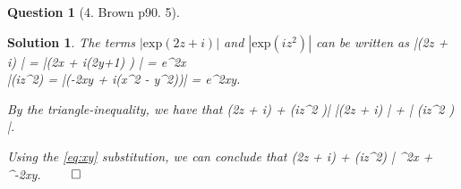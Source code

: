 \documentclass{article} %
\def\eQb#1\eQe{\begin{eqnarray*}#1\end{eqnarray*}}
\def\eQnb#1\eQne{\begin{eqnarray}#1\end{eqnarray}}
\theoremstyle{quest}
\newtheorem*{question}{Question}
\newtheorem*{solution}{Solution}
\begin{document}
\pagebreak

\begin{question}[4. Brown p90. 5]
\end{question}
\begin{solution}
The terms $| \mathrm{exp}(2z + i) |$ and $| \mathrm{exp}(iz^2 )|$ can be written as
\eQnb \label{eq:xy}
|(2z + i) | = |(2x + i(2y+1) ) | = e^{2x} \\
|(iz^2) = |(-2xy + i(x^2 - y^2))| = e^{2xy}.
\eQne

By the triangle-inequality, we have that 
\eQb
|(2z + i) + (iz^2 )| \leq 
|(2z + i) | + | (iz^2 ) |. 
\eQe

Using the \ref{eq:xy} substitution, we can conclude that
\eQb
|(2z + i) + (iz^2) | \leq {}^{2x} + ^{-2xy}.
\eQe
$\qed$

\end{solution}

\bigskip
\end{document}
